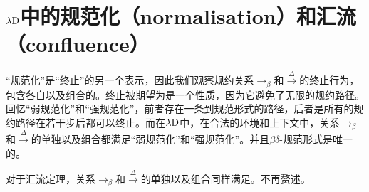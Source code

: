 \documentclass[UTF8]{article}
\begin{document}
	\section{$\lambda{\rm D}$中的规范化（normalisation）和汇流（confluence）}
	\noindent
	“规范化”是“终止”的另一个表示，因此我们观察规约关系$\rightarrow_\beta$和$\stackrel{\Delta}{\rightarrow}$的终止行为，包含各自以及组合的。终止被期望为是一个性质，因为它避免了无限的规约路径。回忆“弱规范化”和“强规范化”，前者存在一条到规范形式的路径，后者是所有的规约路径在若干步后都可以终止。而在$\lambda{\rm D}$中，在合法的环境和上下文中，关系$\rightarrow_\beta$和$\stackrel{\Delta}{\rightarrow}$的单独以及组合都满足“弱规范化”和“强规范化”。并且$\beta{\delta}$-规范形式是唯一的。
	
		对于汇流定理，关系$\rightarrow_\beta$和$\stackrel{\Delta}{\rightarrow}$的单独以及组合同样满足。不再赘述。
\end{document}
